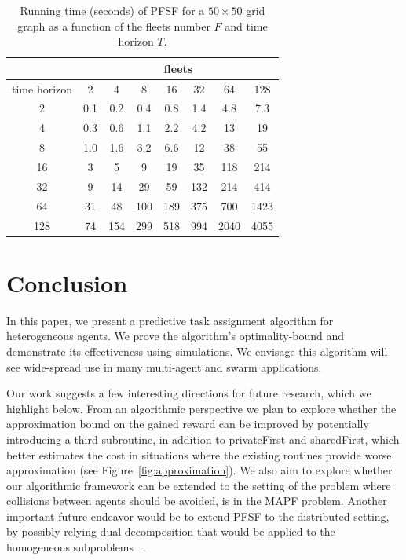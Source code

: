 \documentclass[conference]{IEEEtran}
\begin{document}
\begin{table}[]
\centering
\begin{tabular}{c|c|c|c|c|c|c|c|}
\cline{2-8}
                                   & \multicolumn{7}{c|}{fleets}    \\ \hline
\multicolumn{1}{|L||}{time horizon} & 2 & 4 & 8 & 16 & 32 & 64 & 128 \\ \hline \hline
\multicolumn{1}{|c||}{2}            & 0.1 & 0.2 & 0.4 & 0.8 & 1.4 & 4.8 & 7.3  \\ \hline
\multicolumn{1}{|c||}{4}            & 0.3 & 0.6 & 1.1 & 2.2 & 4.2 & 13 & 19  \\ \hline
\multicolumn{1}{|c||}{8}            &  1.0 & 1.6 & 3.2 & 6.6 & 12 & 38 & 55  \\ \hline
\multicolumn{1}{|c||}{16}           &  3 & 5 & 9 & 19 & 35 & 118 & 214   \\ \hline
\multicolumn{1}{|c||}{32}           &   9 & 14 & 29 & 59 & 132 & 214 & 414  \\ \hline
\multicolumn{1}{|c||}{64}           &   31 & 48 & 100 & 189 & 375 & 700 & 1423  \\ \hline
\multicolumn{1}{|c||}{128}          &  74 & 154 & 299 & 518 & 994 & 2040 & 4055   \\ \hline
\end{tabular}
\vspace{5pt}
\caption{Running time (seconds) of PFSF for a $50\times 50$ grid graph as a function of the fleets number $F$ and time horizon $T$. \label{tbl:pfsf}}
\end{table}

\section{Conclusion}\label{sec:future}
In this paper, we present a predictive task assignment algorithm for heterogeneous agents. We prove the algorithm's optimality-bound and demonstrate its effectiveness using simulations. We envisage this algorithm will see wide-spread use in many multi-agent and swarm applications. 

Our work suggests a few interesting directions for future research, which we highlight below. From an algorithmic perspective we plan to explore whether the approximation bound on the gained reward can be improved by potentially introducing a third subroutine, in addition to privateFirst and sharedFirst, which better estimates the cost in situations where the existing routines provide worse approximation (see Figure~\ref{fig:approximation}). We also aim to explore whether our algorithmic framework can be extended to the setting of the problem where collisions between agents should be avoided, is in the MAPF problem. Another important future endeavor would be to extend PFSF to the distributed setting, by possibly relying dual decomposition that would be applied to the homogeneous subproblems ~\cite[Chapter~7]{Ref:Bertsekas2016Nonlinear}.
\end{document}
